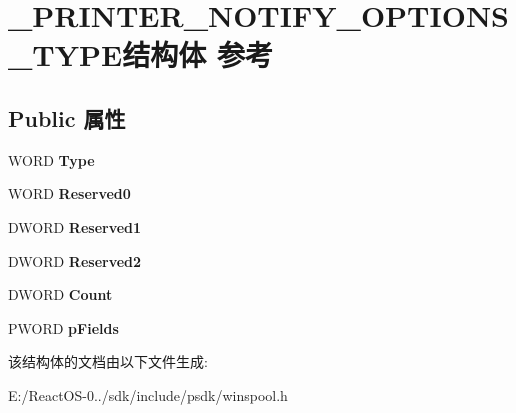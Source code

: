\hypertarget{struct___p_r_i_n_t_e_r___n_o_t_i_f_y___o_p_t_i_o_n_s___t_y_p_e}{}\section{\+\_\+\+P\+R\+I\+N\+T\+E\+R\+\_\+\+N\+O\+T\+I\+F\+Y\+\_\+\+O\+P\+T\+I\+O\+N\+S\+\_\+\+T\+Y\+P\+E结构体 参考}
\label{struct___p_r_i_n_t_e_r___n_o_t_i_f_y___o_p_t_i_o_n_s___t_y_p_e}
\subsection*{Public 属性}
\begin{DoxyCompactItemize}
\item 
\mbox{\label{struct___p_r_i_n_t_e_r___n_o_t_i_f_y___o_p_t_i_o_n_s___t_y_p_e_a637f11073ee07dd1000f2f7367acd542}} 
W\+O\+RD {\bfseries Type}
\item 
\mbox{\label{struct___p_r_i_n_t_e_r___n_o_t_i_f_y___o_p_t_i_o_n_s___t_y_p_e_ad297080ab3b1620b934eb756fc5e2153}} 
W\+O\+RD {\bfseries Reserved0}
\item 
\mbox{\label{struct___p_r_i_n_t_e_r___n_o_t_i_f_y___o_p_t_i_o_n_s___t_y_p_e_a90a2ea113fc86d18f8738387c5264889}} 
D\+W\+O\+RD {\bfseries Reserved1}
\item 
\mbox{\label{struct___p_r_i_n_t_e_r___n_o_t_i_f_y___o_p_t_i_o_n_s___t_y_p_e_a3c689524b86641e990b60c71effc3ae6}} 
D\+W\+O\+RD {\bfseries Reserved2}
\item 
\mbox{\label{struct___p_r_i_n_t_e_r___n_o_t_i_f_y___o_p_t_i_o_n_s___t_y_p_e_aeef36ea917e0219d173b9591f0c94dc5}} 
D\+W\+O\+RD {\bfseries Count}
\item 
\mbox{\label{struct___p_r_i_n_t_e_r___n_o_t_i_f_y___o_p_t_i_o_n_s___t_y_p_e_adbb302ee47b4167c4b9abb47458f6669}} 
P\+W\+O\+RD {\bfseries p\+Fields}
\end{DoxyCompactItemize}


该结构体的文档由以下文件生成\+:\begin{DoxyCompactItemize}
\item 
E\+:/\+React\+O\+S-\/0../sdk/include/psdk/winspool.\+h\end{DoxyCompactItemize}
